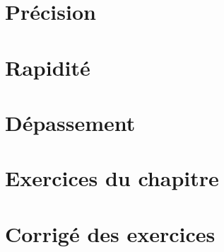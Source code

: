 \section{Précision}

\section{Rapidité}

\section{Dépassement}


\newpage
\section*{Exercices du chapitre}


\exercice{}
\question

\newpage
\section*{Corrigé des exercices}


